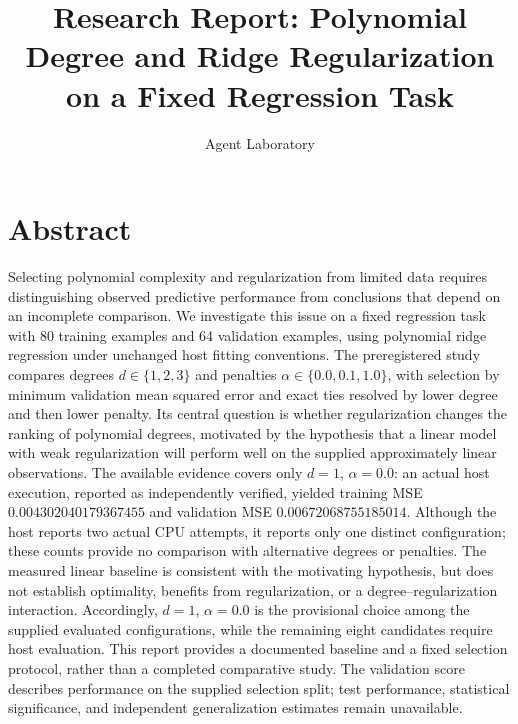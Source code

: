 \documentclass[11pt]{article}
\title{Research Report: Polynomial Degree and Ridge Regularization on a Fixed Regression Task}
\author{Agent Laboratory}
\date{}
\begin{document}
\maketitle

\section{Abstract}
Selecting polynomial complexity and regularization from limited data requires distinguishing observed predictive performance from conclusions that depend on an incomplete comparison. We investigate this issue on a fixed regression task with 80 training examples and 64 validation examples, using polynomial ridge regression under unchanged host fitting conventions. The preregistered study compares degrees \(d \in \{1,2,3\}\) and penalties \(\alpha \in \{0.0,0.1,1.0\}\), with selection by minimum validation mean squared error and exact ties resolved by lower degree and then lower penalty. Its central question is whether regularization changes the ranking of polynomial degrees, motivated by the hypothesis that a linear model with weak regularization will perform well on the supplied approximately linear observations. The available evidence covers only \(d=1\), \(\alpha=0.0\): an actual host execution, reported as independently verified, yielded training MSE \(0.004302040179367455\) and validation MSE \(0.00672068755185014\). Although the host reports two actual CPU attempts, it reports only one distinct configuration; these counts provide no comparison with alternative degrees or penalties. The measured linear baseline is consistent with the motivating hypothesis, but does not establish optimality, benefits from regularization, or a degree--regularization interaction. Accordingly, \(d=1\), \(\alpha=0.0\) is the provisional choice among the supplied evaluated configurations, while the remaining eight candidates require host evaluation. This report provides a documented baseline and a fixed selection protocol, rather than a completed comparative study. The validation score describes performance on the supplied selection split; test performance, statistical significance, and independent generalization estimates remain unavailable.
\end{document}
